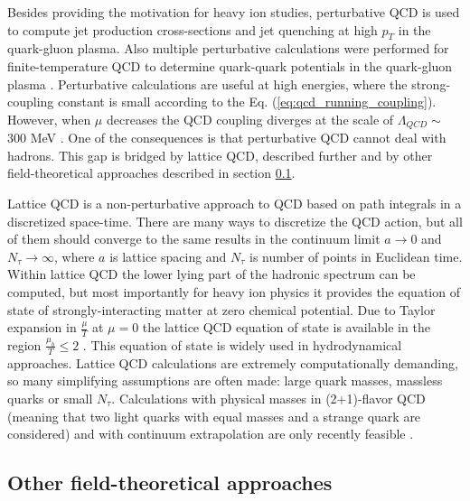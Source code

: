 Besides providing the motivation for heavy ion studies, perturbative QCD is
used to compute jet production cross-sections and jet quenching at high $p_T$
in the quark-gluon plasma. Also multiple perturbative calculations were
performed for finite-temperature QCD to determine quark-quark potentials in the
quark-gluon plasma \cite{Gross:1980br}. Perturbative calculations are
useful at high energies, where the strong-coupling constant is small according
to the Eq. (\ref{eq:qcd_running_coupling}). However, when $\mu$ decreases
the QCD coupling diverges at the scale of $\Lambda_{QCD} \sim $ 300 MeV \cite{Bruno:2017lta}.
One of the consequences is that perturbative QCD cannot deal with hadrons. This
gap is bridged by lattice QCD, described further and by other field-theoretical
approaches described in section \ref{sec:other_field_theories}.

Lattice QCD is a non-perturbative approach to QCD based on path integrals in a
discretized space-time. There are many ways to discretize the QCD action, but all
of them should converge to the same results in the continuum limit $a \to 0$
and $N_{\tau} \to \infty$, where $a$ is lattice spacing and $N_{\tau}$ is number
of points in Euclidean time. Within lattice QCD the lower lying part of the hadronic
spectrum can be computed, but most importantly for heavy ion physics it provides the
equation of state of strongly-interacting matter at zero chemical potential.
Due to Taylor expansion in $\frac{\mu}{T}$ at $\mu = 0$ the lattice QCD
equation of state is available in the region $\frac{\mu_b}{T} \le 2$
\cite{Borsanyi:2013bia,Bazavov:2014pvz,Bazavov:2017dus}. This
equation of state is widely used in hydrodynamical approaches. Lattice QCD
calculations are extremely computationally demanding, so many simplifying
assumptions are often made: large quark masses, massless quarks or small
$N_{\tau}$. Calculations with physical masses in (2+1)-flavor QCD (meaning that two
light quarks with equal masses and a strange quark are considered) and with
continuum extrapolation are only recently feasible \cite{Borsanyi:2014rza}.


\subsection{Other field-theoretical approaches} \label{sec:other_field_theories}

